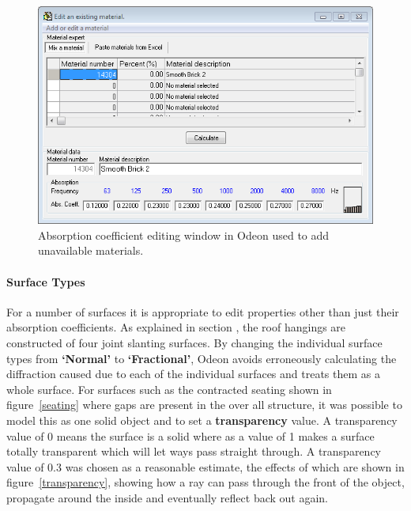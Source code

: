 \documentclass[../../main.tex]{subfiles}
\begin{document}
			\begin{figure}[H]
				\centerline{\includegraphics[scale = 0.6]{Sections/Implementation/Odeon/images/Absorption.PNG}}
				\caption{Absorption coefficient editing window in Odeon used to add unavailable materials.}
				\label{materialEdit}
			\end{figure}

		\paragraph{Surface Types}

			For a number of surfaces it is appropriate to edit properties other than just their absorption coefficients. As explained in section , the roof hangings are constructed of four joint slanting surfaces. By changing the individual surface types from \textbf{`Normal'} to \textbf{`Fractional'}, Odeon avoids erroneously calculating the diffraction caused due to each of the individual surfaces and treats them as a whole surface. For surfaces such as the contracted seating shown in figure~\ref{seating} where gaps are present in the over all structure, it was possible to model this as one solid object and to set a \textbf{transparency} value. A transparency value of 0 means the surface is a solid where as a value of 1 makes a surface totally transparent which will let ways pass straight through. A transparency value of 0.3 was chosen as a reasonable estimate, the effects of which are shown in figure~\ref{transparency}, showing how a ray can pass through the front of the object, propagate around the inside and eventually reflect back out again.
\end{document}
